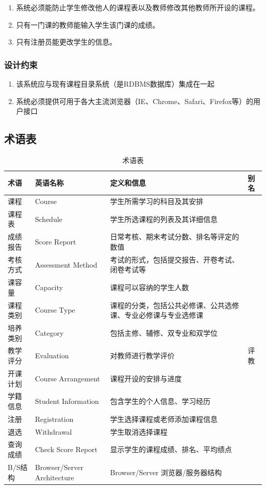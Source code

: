  \begin{enumerate}
    \item 系统必须能防止学生修改他人的课程表以及教师修改其他教师所开设的课程。
    \item 只有一门课的教师能输入学生该门课的成绩。
    \item 只有注册员能更改学生的信息。
  \end{enumerate}
  
\subsubsection{设计约束}
  
  \begin{enumerate}
    \item 该系统应与现有课程目录系统（是RDBMS数据库）集成在一起
    \item 系统必须提供可用于各大主流浏览器（IE、Chrome、Safari、Firefox等）的用户接口
  \end{enumerate}

\subsection{术语表}
  \begin{table}[H]
    \caption{术语表}
    \begin{tabularx}{\textwidth}{|l|l|X|l|}
    \hline
    \textbf{术语} & \textbf{英语名称} & \textbf{定义和信息} & \textbf{别名}\\
    \hline
    课程&Course&学生所需学习的科目及其安排&\\
    \hline
    课程表&Schedule&学生所选课程的列表及其详细信息&\\
    \hline
    成绩报告&Score Report&日常考核、期末考试分数、排名等评定的数值&\\
    \hline
    考核方式&Assessment Method&考试的形式，包括提交报告、开卷考试、闭卷考试等&\\
    \hline
    课容量&Capacity&课程可以容纳的学生人数&\\
    \hline
    课程类别&Course Type&课程的分类，包括公共必修课、公共选修课、专业必修课与专业选修课&\\
    \hline
    培养类别&Category&包括主修、辅修、双专业和双学位&\\
    \hline
    教学评分&Evaluation&对教师进行教学评价&评教\\
    \hline
    开课计划&Course Arrangement&课程开设的安排与进度&\\
    \hline
    学籍信息&Student Information&包含学生的个人信息、学习经历&\\
    \hline
    注册&Registration&学生选择课程或老师添加课程信息&\\
    \hline
    退选&Withdrawal&学生取消选择课程&\\
    \hline
    查询成绩&Check Score Report&显示学生的课程成绩、排名、平均绩点&\\
    \hline
    B/S结构&Browser/Server Architecture&Browser/Server 浏览器/服务器结构&\\
    \hline
  \end{tabularx}
  
\end{table}


